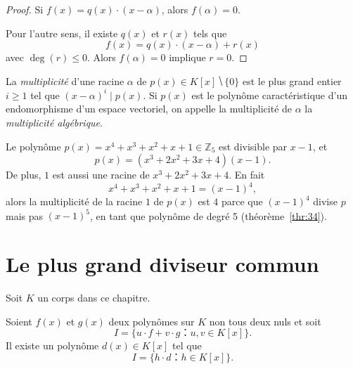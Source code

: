 \begin{proof}
  Si $f(x) = q(x) \cdot (x - \alpha)$, alors $f(\alpha) = 0$. 

Pour l'autre sens, il existe $q(x)$ et $r(x)$ tels que
\begin{displaymath}
  f(x) = q(x) \cdot (x - \alpha) + r(x)
\end{displaymath}
avec $\deg(r) \leq 0$. Alors $f(\alpha) = 0$ implique $r=0$. 
\end{proof}


\begin{definition}
  \label{def:41}
  La \emph{multiplicité} d'une racine $α$ de $p(x) ∈ K[x] ⧹\{0\}$ est le plus grand entier $i≥1$ tel que $ (x-α)^i \mid p(x)$. Si $p(x)$ est le polynôme caractéristique d'un endomorphisme d'un espace vectoriel, on appelle la multiplicité de $α$ la \emph{multiplicité algébrique}. 
\end{definition} 


\begin{example}  
  \label{exe:45}
  Le polynôme  $p(x) = x^4 + x^3 + x^2 + x + 1  ∈ℤ_5$  est divisible par $x-1$, et
  \begin{displaymath}
    p(x)  = (x^3 + 2x^2 + 3x + 4)  (x-1). 
  \end{displaymath}
  De plus, $1$ est aussi une racine de $x^3 + 2x^2 + 3x + 4$. En fait 
  \begin{displaymath}
    x^4 + x^3 + x^2 + x + 1 = (x-1)^4,
  \end{displaymath}
  alors la multiplicité de la racine $1$ de $p(x)$ est $4$ parce que $(x-1)^4$ divise $p$ mais pas $(x-1)^5$, en tant que polynôme de degré 5 (théorème~\ref{thr:34}).   
\end{example}




\section{Le plus grand diviseur commun}
\label{sec:fact-de-polyn}

Soit $K$ un corps dans ce chapitre. 

\begin{theorem}
  \label{thr:54}
  Soient $f(x)$ et $g(x)$ deux polynômes sur $K$ non tous deux nuls et soit 
  \begin{displaymath}
    I = \{ u ⋅ f + v ⋅ g ： u,v ∈ K[x]\}.
  \end{displaymath}
  Il existe un  polynôme $d(x)∈K[x]$ tel que
  \begin{equation}
    \label{eq:51}
    I = \{ h ⋅ d ： h ∈ K[x]\}. 
  \end{equation}
\end{theorem}

